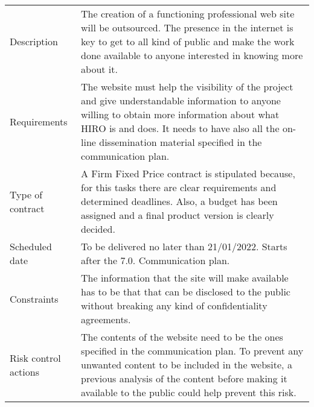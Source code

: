 \begin{table}[H]
	\centering
	\begin{tabular}{>{\raggedright\arraybackslash}p{3cm} >{\arraybackslash}p{11cm}}
		
		\toprule[2pt]
		
		\multicolumn{2}{c}{\textbf{SOW - 7.2.1. Web site development}}\\
		
		\midrule[1.5pt]
		
		Description & The creation of a functioning professional web site will be outsourced. The presence in the internet is key to get to all kind of public and make the work done available to anyone interested in knowing more about it.\vspace{0.2cm} \\
		
		\midrule
		
		Requirements & The website must help the visibility of the project and give understandable information to anyone willing to obtain more information about what HIRO is and does. It needs to have also all the on-line dissemination material specified in the communication plan.\vspace{0.2cm} \\
		
		\midrule
		
		Type of contract & A Firm Fixed Price contract is stipulated because, for this tasks there are clear requirements and determined deadlines. Also, a budget has been assigned and a final product version is clearly decided.\vspace{0.2cm} \\
		
		\midrule
		
		Scheduled date & To be delivered no later than 21/01/2022. Starts after the 7.0. Communication plan.\vspace{0.2cm} \\
		
		\midrule
		
		Constraints & The information that the site will make available has to be that that can be disclosed to the public without breaking any kind of confidentiality agreements.\vspace{0.2cm} \\
		
		\midrule
		
		Risk control actions & The contents of the website need to be the ones specified in the communication plan. To prevent any unwanted content to be included in the website, a previous analysis of the content before making it available to the public could help prevent this risk.\vspace{0.2cm} \\
		

\end{tabular}
\end{table}
